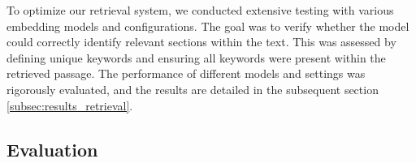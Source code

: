\documentclass[conference]{IEEEtran}
\begin{document}
To optimize our retrieval system, we conducted extensive testing with various embedding models and configurations. The goal was to verify whether the model could correctly identify relevant sections within the text. This was assessed by defining unique keywords and ensuring all keywords were present within the retrieved passage. The performance of different models and settings was rigorously evaluated, and the results are detailed in the subsequent section \ref{subsec:results_retrieval}.

\iffalse
Another challenge was the extraction of data from tables within PDFs. Standard extraction techniques often resulted in errors, such as missing information or incorrect data due to formatting issues. After evaluating several tools, including Optical Character Recognition (OCR) and advanced language models like ChatGPT, we concluded that current methods are insufficiently reliable for extracting tabular data. Consequently, we excluded tables from our retrieval process, marking this as an area for future research.
\fi



\subsection{Evaluation}

\end{document}
